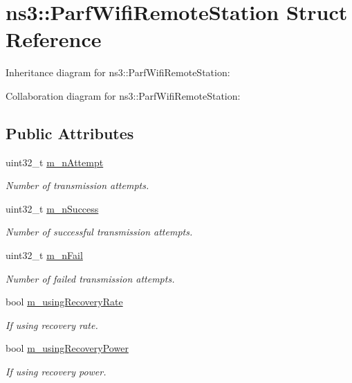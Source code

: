 \hypertarget{structns3_1_1ParfWifiRemoteStation}{}\section{ns3\+:\+:Parf\+Wifi\+Remote\+Station Struct Reference}
\label{structns3_1_1ParfWifiRemoteStation}


Inheritance diagram for ns3\+:\+:Parf\+Wifi\+Remote\+Station\+:


Collaboration diagram for ns3\+:\+:Parf\+Wifi\+Remote\+Station\+:
\subsection*{Public Attributes}
\begin{DoxyCompactItemize}
\item 
uint32\+\_\+t \hyperlink{structns3_1_1ParfWifiRemoteStation_ac42c729315243f1f113ded47848e9763}{m\+\_\+n\+Attempt}
\begin{DoxyCompactList}\small\item\em Number of transmission attempts. \end{DoxyCompactList}\item 
uint32\+\_\+t \hyperlink{structns3_1_1ParfWifiRemoteStation_a83947ebdf86ba73ae69e4a9922ae4b2a}{m\+\_\+n\+Success}
\begin{DoxyCompactList}\small\item\em Number of successful transmission attempts. \end{DoxyCompactList}\item 
uint32\+\_\+t \hyperlink{structns3_1_1ParfWifiRemoteStation_a2f4264dc9e0f39b2dbd386364cc74a35}{m\+\_\+n\+Fail}
\begin{DoxyCompactList}\small\item\em Number of failed transmission attempts. \end{DoxyCompactList}\item 
bool \hyperlink{structns3_1_1ParfWifiRemoteStation_a50166b4876038ce4ddce7081829f8cb1}{m\+\_\+using\+Recovery\+Rate}
\begin{DoxyCompactList}\small\item\em If using recovery rate. \end{DoxyCompactList}\item 
bool \hyperlink{structns3_1_1ParfWifiRemoteStation_a18a3f40f7be071793846886996ee6a4c}{m\+\_\+using\+Recovery\+Power}
\begin{DoxyCompactList}\small\item\em If using recovery power. \end{DoxyCompactList}\item 

\end{DoxyCompactItemize}
